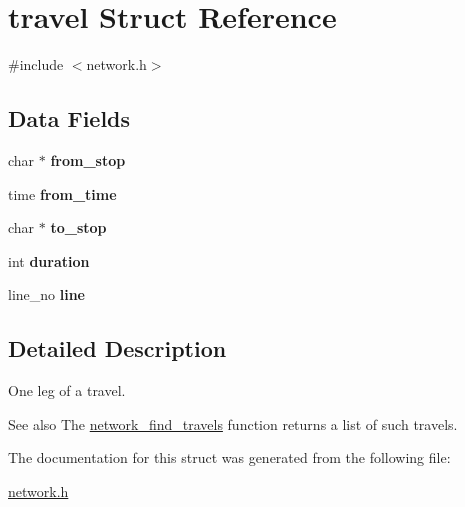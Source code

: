 \hypertarget{structtravel}{}\section{travel Struct Reference}
\label{structtravel}


{\ttfamily \#include $<$network.\+h$>$}

\subsection*{Data Fields}
\begin{DoxyCompactItemize}
\item 
\hypertarget{structtravel_a92189a6bc8ed7822505ae8e11470d9b5}{}char $\ast$ {\bfseries from\+\_\+stop}\label{structtravel_a92189a6bc8ed7822505ae8e11470d9b5}

\item 
\hypertarget{structtravel_aa080efe4ee2a336fcdc143337cebebf1}{}time {\bfseries from\+\_\+time}\label{structtravel_aa080efe4ee2a336fcdc143337cebebf1}

\item 
\hypertarget{structtravel_a40c20e55af9337b5933a598a8c39f808}{}char $\ast$ {\bfseries to\+\_\+stop}\label{structtravel_a40c20e55af9337b5933a598a8c39f808}

\item 
\hypertarget{structtravel_a2c0504135b4e8d7f7295b8f71746b5f5}{}int {\bfseries duration}\label{structtravel_a2c0504135b4e8d7f7295b8f71746b5f5}

\item 
\hypertarget{structtravel_a063d9404db136c8e1f87a68d7a1b1e92}{}line\+\_\+no {\bfseries line}\label{structtravel_a063d9404db136c8e1f87a68d7a1b1e92}

\end{DoxyCompactItemize}


\subsection{Detailed Description}
One leg of a travel.

\begin{DoxySeeAlso}{See also}
The \hyperlink{network_8h_a4e0904506d9a1c14d1649db55e2d2d12}{network\+\_\+find\+\_\+travels} function returns a list of such travels. 
\end{DoxySeeAlso}


The documentation for this struct was generated from the following file\+:\begin{DoxyCompactItemize}
\item 
\hyperlink{network_8h}{network.\+h}\end{DoxyCompactItemize}

